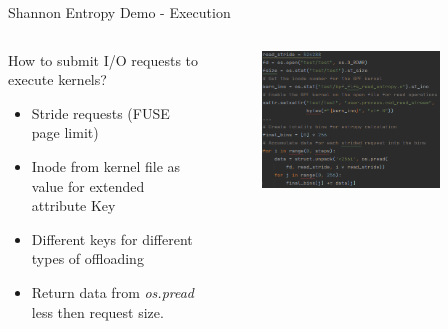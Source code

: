 \documentclass[aspectratio=169, notes]{beamer}
\begin{document}
\begin{frame}{Shannon Entropy Demo - Execution}
    \begin{columns}
        \begin{column}{0.40\textwidth}
            \footnotesize
            How to submit I/O requests to execute kernels?
            \begin{itemize}
                \item Stride requests (FUSE page limit)
                \item Inode from kernel file as value for extended attribute
                      Key
                \item Different keys for different types of offloading
                \item Return data from \textit{os.pread} less then request
                      size.
            \end{itemize}
        \end{column}
        \begin{column}{0.60\textwidth}
            \begingroup
            \small
            \begin{figure}
                \centering
                \includegraphics[width=0.85\textwidth]{resources/images/python-kernel.png}
            \end{figure}
            \endgroup
        \end{column}
    \end{columns}
\end{frame}
\end{document}
